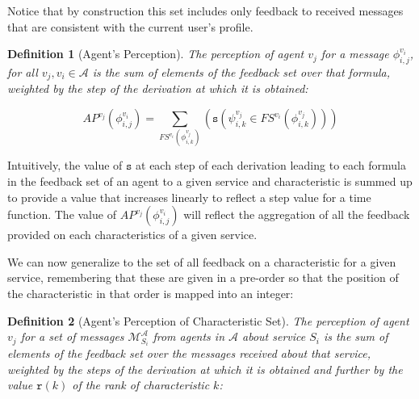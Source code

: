 \documentclass[compsoc, conference, letterpaper, 10pt, times]{IEEEtran}
\newtheorem{definition}{Definition}
\begin{document}
Notice that by construction this set includes only feedback to received messages that are consistent with the current user's profile. 

\begin{definition}[Agent's Perception]
The perception of agent $v_{j}$ for a message $\phi^{v_{i}}_{i,j}$, for all $v_{j}, v_{i} \in \mathcal{A}$ is the sum of elements of the feedback set over that formula, weighted by the step of the derivation at which it is obtained: 

\[
AP^{v_{j}}(\phi^{v_{i}}_{i,j})=\sum_{FS^{v_{i}}(\phi^{v_{j}}_{i,k})}(\mathtt{s}(\psi^{v_{j}}_{i,k} \in FS^{v_{i}}(\phi^{v_{j}}_{i,k})))
\]

\end{definition}

Intuitively, the value of $\mathtt{s}$ at each step of each derivation leading to each formula in the feedback set of an agent to a given service and characteristic is summed up to provide a value that increases linearly to reflect a step value for a time function. The value of $AP^{v_{j}}(\phi^{v_{i}}_{i,j})$ will reflect the aggregation of all the feedback provided on each characteristics of a given service.  


We can now generalize to the set of all feedback on a characteristic for a given service, remembering that these are given in a pre-order so that the position of the characteristic in that order is mapped into an integer:


\begin{definition}[Agent's Perception of Characteristic Set]
The perception of agent $v_{j}$ for a set of messages $\mathcal{M}^{\mathcal{A}}_{S_{i}}$ from agents in $\mathcal{A}$ about service $S_{i}$ 
is the sum of elements of the feedback set over the messages received about that service, weighted by the steps of the derivation at which it is obtained and further by the value $\mathtt{r}(k)$ of the rank of characteristic $k$: 

\begin{array}}{l}
\begin{displaymath}


AP^{v_{j}}(\mathcal{M}^{\mathcal{A}}_{S_{i}, C_{k}})=\\
\sum_{FS^{v_{i}}(\phi^{v_{j}}_{i,k}\dots \phi^{v_{n}}_{i,k})}\\
(1-\mathtt{r}(C_{k})(\mathtt{s}(\psi^{v_{j}}_{i,k} \in FS^{v_{i}}(\phi^{v_{j}}_{i,k}\dots \phi^{v_{n}}_{i,k}))))

\end{displaymath}
\end{array}
\end{definition}
\end{document}
